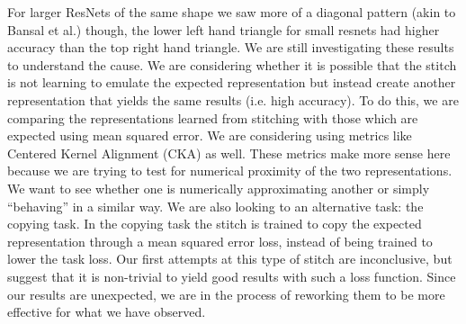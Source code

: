 \documentclass{article} %
\begin{document}
For larger ResNets of the same shape we saw more of a diagonal pattern (akin to Bansal et al.) though, the lower left hand triangle for small
resnets had higher
accuracy than the top right hand triangle. 
We are still investigating these results to understand the cause. We are considering
whether it is possible that the stitch is not learning to emulate the expected representation but instead create another representation
that yields the same results (i.e. high accuracy). To do this, we are comparing the representations learned from stitching
with those which are expected using mean squared error. We are considering using metrics like Centered Kernel Alignment
(CKA) as well. These metrics make more sense here because we are trying to test for numerical proximity of the two
representations. We want to see whether one is numerically approximating another or simply ``behaving'' in a similar
way. We are also looking to an alternative task: the copying task. In the copying task the stitch is trained to copy
the expected representation through a mean squared error loss, instead of being trained to lower the task loss.
Our first attempts at this type of stitch are inconclusive, but suggest that it is non-trivial to yield good results
with such a loss function. Since our results are unexpected, we are in the process of reworking them to
be more effective for what we have observed.
\end{document}
